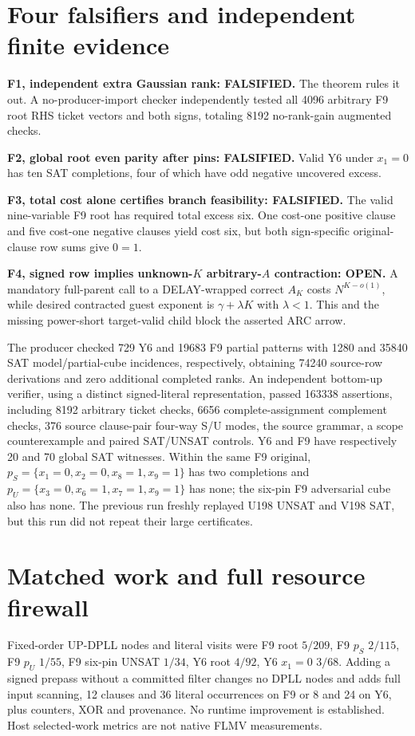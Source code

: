 \documentclass[11pt]{article}
\begin{document}
\section{Four falsifiers and independent finite evidence}
\noindent\textbf{F1, independent extra Gaussian rank: FALSIFIED.} The theorem rules it out. A no-producer-import checker independently tested all 4096 arbitrary F9 root RHS ticket vectors and both signs, totaling 8192 no-rank-gain augmented checks.
\par\noindent\textbf{F2, global root even parity after pins: FALSIFIED.} Valid Y6 under $x_1=0$ has ten SAT completions, four of which have odd negative uncovered excess.
\par\noindent\textbf{F3, total cost alone certifies branch feasibility: FALSIFIED.} The valid nine-variable F9 root has required total excess six. One cost-one positive clause and five cost-one negative clauses yield cost six, but both sign-specific original-clause row sums give $0=1$.
\par\noindent\textbf{F4, signed row implies unknown-$K$ arbitrary-$A$ contraction: OPEN.} A mandatory full-parent call to a DELAY-wrapped correct $A_K$ costs $N^{K-o(1)}$, while desired contracted guest exponent is $\gamma+\lambda K$ with $\lambda<1$. This and the missing power-short target-valid child block the asserted ARC arrow.

The producer checked 729 Y6 and 19683 F9 partial patterns with 1280 and 35840 SAT model/partial-cube incidences, respectively, obtaining 74240 source-row derivations and zero additional completed ranks. An independent bottom-up verifier, using a distinct signed-literal representation, passed 163338 assertions, including 8192 arbitrary ticket checks, 6656 complete-assignment complement checks, 376 source clause-pair four-way S/U modes, the source grammar, a scope counterexample and paired SAT/UNSAT controls. Y6 and F9 have respectively 20 and 70 global SAT witnesses. Within the same F9 original, $p_S=\{x_1=0,x_2=0,x_8=1,x_9=1\}$ has two completions and $p_U=\{x_3=0,x_6=1,x_7=1,x_9=1\}$ has none; the six-pin F9 adversarial cube also has none. The previous run freshly replayed U198 UNSAT and V198 SAT, but this run did not repeat their large certificates.

\section{Matched work and full resource firewall}
Fixed-order UP-DPLL nodes and literal visits were F9 root $5/209$, F9 $p_S$ $2/115$, F9 $p_U$ $1/55$, F9 six-pin UNSAT $1/34$, Y6 root $4/92$, Y6 $x_1=0$ $3/68$. Adding a signed prepass without a committed filter changes no DPLL nodes and adds full input scanning, 12 clauses and 36 literal occurrences on F9 or 8 and 24 on Y6, plus counters, XOR and provenance. No runtime improvement is established. Host selected-work metrics are not native FLMV measurements.
\end{document}
